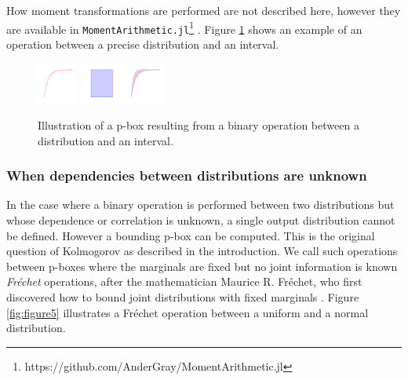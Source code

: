 \documentclass{juliacon}
\begin{document}
\noindent How moment transformations are performed are not described here, however they are available in \texttt{MomentArithmetic.jl}\footnote{https://github.com/AnderGray/MomentArithmetic.jl} \cite{ferson2021distribution}. Figure \ref{fig:figure4} shows an example of an operation between a precise distribution and an interval.
\begin{figure}[htp]

  \centering
  \includegraphics[width=0.12\textwidth]{../examples/JuliaCon/fig4/fig4_dist.pdf}
  \raisebox{8.0mm}{\noindent\Large*}
  \includegraphics[width=0.12\textwidth]{../examples/JuliaCon/fig4/fig4_in.pdf}
  \raisebox{9.0mm}{{\Large$\rightarrow$}}
  \includegraphics[width=0.12\textwidth]{../examples/JuliaCon/fig4/fig4_pbox.pdf}
  

  \caption{Illustration of a p-box resulting from a binary operation between a distribution and an interval.}
  \label{fig:figure4}
  
\end{figure}


\subsubsection{When dependencies between distributions are unknown}

In the case where a binary operation is performed between two distributions but whose dependence or correlation is unknown, a single output distribution cannot be defined. However a bounding p-box can be computed. This is the original question of Kolmogorov as described in the introduction. We call such operations between p-boxes where the marginals are fixed but no joint information is known \textit{Fréchet} operations, after the mathematician Maurice R. Fréchet, who first discovered how to bound joint distributions with fixed marginals \cite{frechet1935generalisation}. Figure \ref{fig:figure5} illustrates a Fréchet operation between a uniform and a normal distribution.
\end{document}
